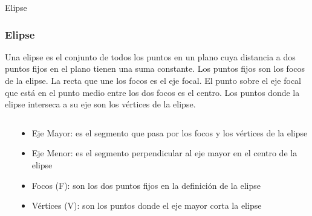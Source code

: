\documentclass[xcolor={dvipsnames},aspectratio=169,10pt]{beamer}
\begin{document}
\begin{frame}{Elipse}
  \frametitle{Elipse}
    Una elipse es el conjunto de todos los puntos en un plano cuya distancia a dos puntos fijos en el plano tienen una suma constante. 
    Los puntos fijos son los focos de la elipse. La recta que une los focos es el eje focal. El punto sobre el eje focal que está en el 
    punto medio entre los dos focos es el centro. Los puntos donde la elipse interseca a su eje son los vértices de la elipse.
  \begin{columns}
    \begin{column}{0.5\textwidth}
    \end{column}
    \begin{column}{0.5\textwidth}
      \begin{itemize}
        \item Eje Mayor: es el segmento que pasa por los focos y los vértices de la elipse
        \item Eje Menor: es el segmento perpendicular al eje mayor en el centro de la elipse
        \item Focos (F): son los dos puntos fijos en la definición de la elipse
        \item Vértices (V): son los puntos donde el eje mayor corta la elipse
      \end{itemize}
    \end{column}
  \end{columns}
\end{frame}
\end{document}
